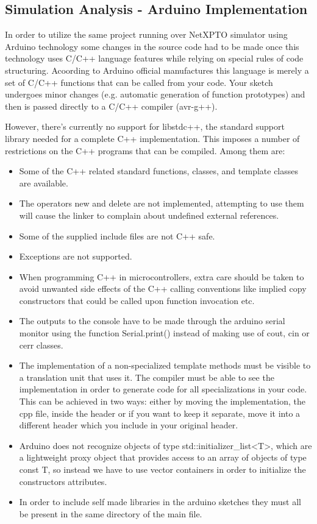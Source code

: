 \begin{refsection}
\begin{itemize}
\end{itemize}
	
	
	
	
	
	\subsection{Simulation Analysis - Arduino Implementation}
	
	In order to utilize the same project running over NetXPTO simulator using Arduino technology some changes in the source code had to be made once this technology uses C/C++ language features while relying on special rules of code structuring. Acoording to Arduino official manufactures this language is merely a set of C/C++ functions that can be called from your code. Your sketch undergoes minor changes (e.g. automatic generation of function prototypes) and then is passed directly to a C/C++ compiler (avr-g++). \par However, there's currently no support for libstdc++, the standard support library needed for a complete C++ implementation. This imposes a number of restrictions on the C++ programs that can be compiled. Among them are:
	
	\begin{itemize}
		\item Some of the C++ related standard functions, classes, and template classes are available.
		\item The operators new and delete are not implemented, attempting to use them will cause the linker to complain about undefined external references.
		\item Some of the supplied include files are not C++ safe.
		\item Exceptions are not supported.
		\item When programming C++ in microcontrollers, extra care should be taken to avoid unwanted side effects of the C++ calling conventions like implied copy constructors that could be called upon function invocation etc.
		\item The outputs to the console have to be made through the arduino serial monitor using the function Serial.print() instead of making use of cout, cin or cerr classes.
		\item  The implementation of a non-specialized template methods must be visible to a translation unit that uses it. The compiler must be able to see the implementation in order to generate code for all specializations in your code. This can be achieved in two ways: either by moving the implementation, the cpp file, inside the header or if you want to keep it separate, move it into a different header which you include in your original header.
		\item Arduino does not recognize objects of type std::initializer\_list<T>, which are a lightweight proxy object that provides access to an array of objects of type const T, so instead we have to use vector containers in order to initialize the constructors attributes.
		\item In order to include self made libraries in the arduino sketches they must all be present in the same directory of the main file.
		

\end{itemize}
\end{refsection}
